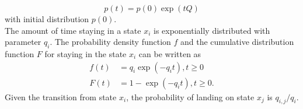 \begin{equation}
p(t)=p(0) \exp (tQ)
\label{eq:ode_sol}
\end{equation}
with initial distribution $ p(0) $.\\
The amount of time staying in a state $ x_{i} $ is exponentially distributed with parameter $ q_{i} $. The probability density function $ f $ and the cumulative distribution function $ F $ for staying in the state $ x_{i} $ can be written as \cite{Nodelman1995}
\begin{align}
f(t) & = q_{i} \exp \left(-q_{i} t\right), t\geq 0  \label{eq:f(t)_homo}\\
F(t) & = 1 - \exp \left(-q_{i} t\right), t\geq 0 .
\end{align}
Given the transition from state $ x_{i} $, the probability of landing on state $ x_{j} $ is $ q_{i,j}/q_{i} $.
